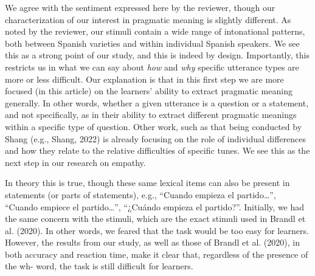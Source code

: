 \documentclass[]{article}
\newcommand{\TaskEstimationBox}[2]{%
\ifoptiondraft{\parbox{1.0\linewidth}{\hfill \hfill {\colorbox{#2}{\color{White} \textbf{#1}}}}}%
{}%
}
\def\Done {\TaskEstimationBox{Done}{Blue}}
\def\Easy {\TaskEstimationBox{Feasible}{ForestGreen}}
\begin{document}

We agree with the sentiment expressed here by the reviewer, though our characterization of our interest in pragmatic meaning is slightly different.
As noted by the reviewer, our stimuli contain a wide range of intonational patterns, both between Spanish varieties and within individual Spanish speakers.
We see this as a strong point of our study, and this is indeed by design.
Importantly, this restricts us in what we can say about \emph{how} and \emph{why} specific utterance types are more or less difficult.
Our explanation is that in this first step we are more focused (in this article) on the learners' ability to extract pragmatic meaning generally.
In other words, whether a given utterance is a question or a statement, and not specifically, as in their ability to extract different pragmatic meanings within a specific type of question.
Other work, such as that being conducted by Shang (e.g., Shang, 2022) is already focusing on the role of individual differences and how they relate to the relative difficulties of specific tunes.
We see this as the next step in our research on empathy.

\Done
\Easy


In theory this is true, though these same lexical items can also be present in statements (or parts of statements), e.g., ``Cuando empieza el partido\ldots{}'', ``Cuando empiece el partido\ldots{}'', ``¿Cuándo empieza el partido?''.
Initially, we had the same concern with the stimuli, which are the exact stimuli used in Brandl et al. (2020).
In other words, we feared that the task would be too easy for learners.
However, the results from our study, as well as those of Brandl et al. (2020), in both accuracy and reaction time, make it clear that, regardless of the presence of the wh- word, the task is still difficult for learners.
\end{document}
